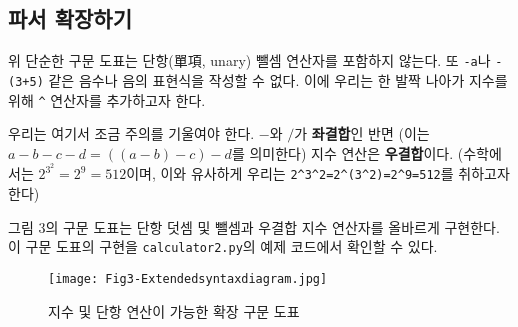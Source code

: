 \documentclass[a4paper]{oblivoir}
\begin{document}
\subsection*{파서 확장하기}

위 단순한 구문 도표는 단항(單項, unary) 뺄셈 연산자를 포함하지 않는다. 또 \texttt{-a}나 \texttt{-(3+5)} 같은 음수나 음의 표현식을 작성할 수 없다. 이에 우리는 한 발짝 나아가 지수를 위해 \texttt{\^{}} 연산자를 추가하고자 한다.

우리는 여기서 조금 주의를 기울여야 한다. $-$와 $/$가 \textbf{좌결합}인 반면 (이는 $a-b-c-d=((a-b)-c)-d$를 의미한다) 지수 연산은 \textbf{우결합}이다. (수학에서는 $2^{3^2}=2^9=512$이며, 이와 유사하게 우리는 \texttt{2\^{}3\^{}2=2\^{}(3\^{}2)=2\^{}9=512}를 취하고자 한다)

그림 3의 구문 도표는 단항 덧셈 및 뺄셈과 우결합 지수 연산자를 올바르게 구현한다. 이 구문 도표의 구현을 \texttt{calculator2.py}의 예제 코드에서 확인할 수 있다.

\begin{figure}[h]
    \centering
    \texttt{[image: Fig3-Extendedsyntaxdiagram.jpg]}
    \caption{지수 및 단항 연산이 가능한 확장 구문 도표}
\end{figure}
\end{document}
